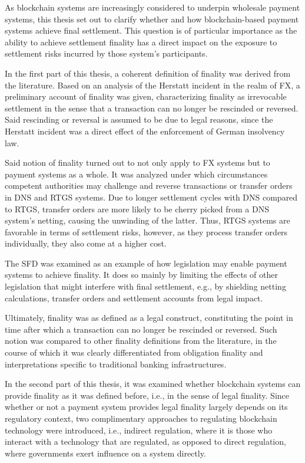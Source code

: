 As blockchain systems are increasingly considered to underpin wholesale payment systems, this thesis set out to clarify whether and how blockchain-based payment systems achieve final settlement.
This question is of particular importance as the ability to achieve settlement finality has a direct impact on the exposure to settlement risks incurred by those system's participants.

In the first part of this thesis, a coherent definition of finality was derived from the literature.
Based on an analysis of the Herstatt incident in the realm of FX, a preliminary account of finality was given, characterizing finality as irrevocable settlement in the sense that a transaction can no longer be rescinded or reversed.
Said rescinding or reversal is assumed to be due to legal reasons, since the Herstatt incident was a direct effect of the enforcement of German insolvency law.

Said notion of finality turned out to not only apply to FX systems but to payment systems as a whole.
It was analyzed under which circumstances competent authorities may challenge and reverse transactions or transfer orders in DNS and RTGS systems.
Due to longer settlement cycles with DNS compared to RTGS, transfer orders are more likely to be cherry picked from a DNS system's netting, causing the unwinding of the latter.
Thus, RTGS systems are favorable in terms of settlement risks, however, as they process transfer orders individually, they also come at a higher cost.

The SFD was examined as an example of how legislation may enable payment systems to achieve finality.
It does so mainly by limiting the effects of other legislation that might interfere with final settlement, e.g., by shielding netting calculations, transfer orders and settlement accounts from legal impact.

Ultimately, finality was as defined as a legal construct, constituting the point in time after which a transaction can no longer be rescinded or reversed.
Such notion was compared to other finality definitions from the literature, in the course of which it was clearly differentiated from obligation finality and interpretations specific to traditional banking infrastructures.

In the second part of this thesis, it was examined whether blockchain systems can provide finality as it was defined before, i.e., in the sense of legal finality.
Since whether or not a payment system provides legal finality largely depends on its regulatory context, two complimentary approaches to regulating blockchain technology were introduced, i.e., indirect regulation, where it is those who interact with a technology that are regulated, as opposed to direct regulation, where governments exert influence on a system directly. 

